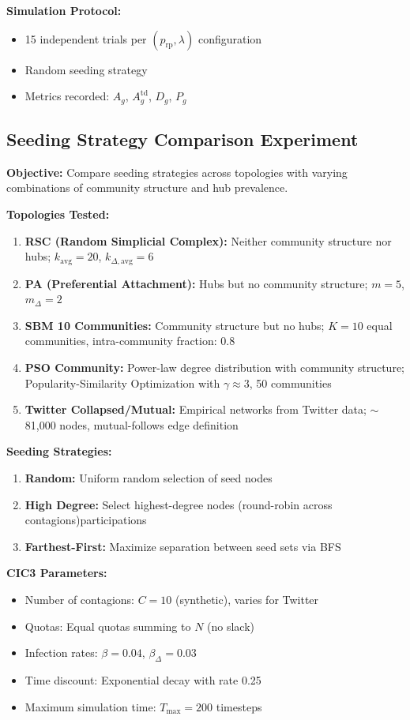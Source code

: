 \documentclass[sigconf]{acmart}
\begin{document}
\textbf{Simulation Protocol:}
\begin{itemize}
    \item 15 independent trials per $(p_{\text{rp}}, \lambda)$ configuration
    \item Random seeding strategy
    \item Metrics recorded: $A_g$, $A_g^{\text{td}}$, $D_g$, $P_g$
\end{itemize}

\subsection{Seeding Strategy Comparison Experiment}
\label{app:seeding}

\textbf{Objective:} Compare seeding strategies across topologies with varying combinations of community structure and hub prevalence.

\textbf{Topologies Tested:}
\begin{enumerate}
    \item \textbf{RSC (Random Simplicial Complex):} Neither community structure nor hubs; $k_{\text{avg}} = 20$, $k_{\Delta,\text{avg}} = 6$
    \item \textbf{PA (Preferential Attachment):} Hubs but no community structure; $m=5$, $m_{\Delta}=2$
    \item \textbf{SBM 10 Communities:} Community structure but no hubs; $K=10$ equal communities, intra-community fraction: 0.8
    \item \textbf{PSO Community:} Power-law degree distribution with community structure; Popularity-Similarity Optimization with $\gamma \approx 3$, 50 communities
    \item \textbf{Twitter Collapsed/Mutual:} Empirical networks from Twitter data; $\sim$81,000 nodes, mutual-follows edge definition
\end{enumerate}

\textbf{Seeding Strategies:}
\begin{enumerate}
    \item \textbf{Random:} Uniform random selection of seed nodes
    \item \textbf{High Degree:} Select highest-degree nodes (round-robin across contagions)participations
    \item \textbf{Farthest-First:} Maximize separation between seed sets via BFS
\end{enumerate}

\textbf{CIC3 Parameters:}
\begin{itemize}
    \item Number of contagions: $C=10$ (synthetic), varies for Twitter
    \item Quotas: Equal quotas summing to $N$ (no slack)
    \item Infection rates: $\beta = 0.04$, $\beta_{\Delta} = 0.03$
    \item Time discount: Exponential decay with rate 0.25
    \item Maximum simulation time: $T_{\text{max}} = 200$ timesteps
\end{itemize}
\end{document}
